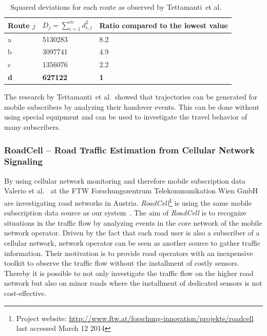 \begin{table}[ht]

\begin{tabular}{l|ll}
\hline
Route $j$                   &  $D_j=\sum_{i=1}^{m} d_{i,j}^{2}$ & Ratio compared to
the lowest value  \\ \hline
a&5130283&8.2 \\
b&3097741&4.9 \\
c&1356076&2.2 \\
\textbf{d}  &\textbf{627122} &\textbf{1} \\ \hline
\end{tabular}
\caption{Squared deviations for each route as observed by Tettamanti~et al.\ \cite{Tettamanti2012}}
\label{tab:tetta}
\end{table}

The research by Tettamanti~et al.\ showed that trajectories can be generated for mobile subscribers by analyzing their handover events. This can be done without using special equipment and can be used to investigate the travel behavior of many subscribers.

\subsubsection{RoadCell -- Road Traffic Estimation from Cellular Network Signaling}
By using cellular network monitoring and therefore mobile subscription data Valerio et al.~\cite{Valerio2009,Valerio20092} at the FTW Forschungszentrum Telekommunikation Wien GmbH are investigating road networks in Austria. \emph{RoadCell}\footnote{Project website: \url{http://www.ftw.at/forschung-innovation/projekte/roadcell} last accessed March 12 2014} is using the same mobile subscription data source as our system~\cite{RoadCell2009}. The aim of \emph{RoadCell} is to recognize situations in the traffic flow by analyzing events in the core network of the mobile network operator. Driven by the fact that each road user is also a subscriber of a cellular network, network operator can be seen as another source to gather traffic information. Their motivation is to provide road operators with an inexpensive toolkit to observe the traffic flow without the installment of costly sensors. Thereby it is possible to not only investigate the traffic flow on the higher road network but also on minor roads where the installment of dedicated sensors is not cost-effective.

